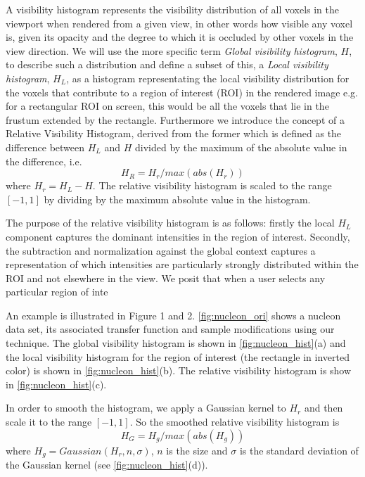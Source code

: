 \documentclass[twoside,twocolumn,10pt]{article}
\begin{document}
A visibility histogram \cite{correa_visibility_2011} represents the visibility distribution of all voxels in the viewport when rendered from a given view, in other words how visible any voxel is, given its opacity and the degree to which it is occluded by other voxels in the view direction. We will use the more specific term \emph{Global visibility histogram}, $ H $, to describe such a distribution and define a subset of this, a \emph{Local visibility histogram}, $ H_{L} $,  as a histogram representating the local visibility distribution for the voxels that contribute to a region of interest (ROI) in the rendered image e.g. for a rectangular ROI on screen, this would be all the voxels that lie in the frustum extended by the rectangle. Furthermore we introduce the concept of a Relative Visibility Histogram, derived from the former which is defined as the difference between $ H_{L} $ and $ H $ divided by the maximum of the absolute value in the difference, i.e.
\[
H_{R}=H_{r}/max(abs(H_{r}))
\]
where $ H_{r}=H_{L}-H$.
The relative visibility histogram is scaled to the range $ [-1,1] $ by dividing by the maximum absolute value in the histogram. 

The purpose of the relative visibility histogram is as follows: firstly the local $ H_L $ component captures the dominant intensities in the  region of interest. Secondly, the subtraction and normalization against the global context captures a representation of which intensities are particularly strongly distributed within the ROI and not elsewhere in the view. We posit that when a user selects any particular region of inte


An example is illustrated in Figure 1 and 2.
\autoref{fig:nucleon_ori} shows a nucleon data set, its associated transfer function and sample modifications using our technique.
The global visibility histogram is shown in 
\autoref{fig:nucleon_hist}(a) and the local visibility histogram for the region of interest (the rectangle in inverted color) is shown in \autoref{fig:nucleon_hist}(b). The relative visibility histogram
is show in \autoref{fig:nucleon_hist}(c).




In order to smooth the histogram, we apply a Gaussian kernel to $ H_{r} $ and then scale it to the range $ [-1,1] $.
So the smoothed relative visibility histogram is
\[ H_{G}= H_{g}/max(abs(H_{g})) \]
where $ H_{g}=Gaussian(H_{r},n,\sigma)$, $ n $ is the size and $ \sigma $ is the standard deviation of the Gaussian kernel (see \autoref{fig:nucleon_hist}(d)).
\end{document}

